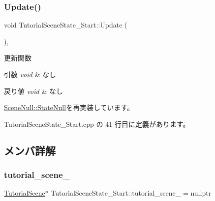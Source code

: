 \subsubsection{\texorpdfstring{Update()}{Update()}}
{\footnotesize\ttfamily void Tutorial\+Scene\+State\+\_\+\+Start\+::\+Update (\begin{DoxyParamCaption}{ }\end{DoxyParamCaption})\hspace{0.3cm}{\ttfamily [override]}, {\ttfamily [virtual]}}



更新関数 


\begin{DoxyParams}{引数}
{\em void} & なし \\
\hline
\end{DoxyParams}

\begin{DoxyRetVals}{戻り値}
{\em void} & なし \\
\hline
\end{DoxyRetVals}


\mbox{\hyperlink{class_scene_null_1_1_state_null_a835f82c22afb290eca79460450088baf}{Scene\+Null\+::\+State\+Null}}を再実装しています。



 Tutorial\+Scene\+State\+\_\+\+Start.\+cpp の 41 行目に定義があります。



\subsection{メンバ詳解}
\mbox{\label{class_tutorial_scene_state___start_a1fea5f4f4713a1461a86cbc9fc263e41}} 
\subsubsection{\texorpdfstring{tutorial\+\_\+scene\+\_\+}{tutorial\_scene\_}}
{\footnotesize\ttfamily \mbox{\hyperlink{class_tutorial_scene}{Tutorial\+Scene}}$\ast$ Tutorial\+Scene\+State\+\_\+\+Start\+::tutorial\+\_\+scene\+\_\+ = nullptr\hspace{0.3cm}{\ttfamily [private]}}



